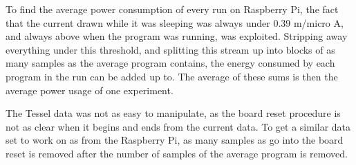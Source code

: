 To find the average power consumption of every run on Raspberry Pi, the fact that the current drawn while it was sleeping was always under 0.39 m/micro A, and always above when the program was running, was exploited. 
Stripping away everything under this threshold, and splitting this stream up into blocks of as many samples as the average program contains, the energy consumed by each program in the run can be added up to. 
The average of these sums is then the average power usage of one experiment.

The Tessel data was not as easy to manipulate, as the board reset procedure is not as clear when it begins and ends from the current data. To get a similar data set to work on as from the Raspberry Pi, as many samples as go into the board reset is removed after the number of samples of the average program is    removed.

